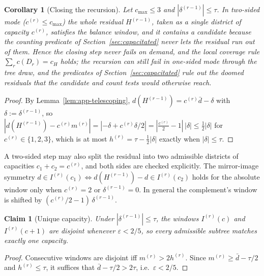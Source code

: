 \documentclass[preprint,12pt,authoryear]{elsarticle}
\newtheorem{corollary}[theorem]{Corollary}
\newtheorem{claim}[theorem]{Claim}
\theoremstyle{definition}
\begin{document}
\begin{corollary}[Closing the recursion]\label{cor:app-closing}\label{thm:feasibility}\label{thm:feas}
Let $c_{\max}\le 3$ and $|\delta^{(r-1)}|\le\tau$. In two-sided mode ($c^{(r)}\le c_{\max}$) the whole residual $H^{(r-1)}$, taken as a single district of capacity $c^{(r)}$, satisfies the balance window, and it contains a candidate because the counting predicate of Section~\ref{sec:capacitated} never lets the residual run out of them. Hence the closing step never fails on demand, and the local coverage rule $\sum_r c(D_r)=c_H$ holds; the recursion can still fail in one-sided mode through the tree draw, and the predicates of Section~\ref{sec:capacitated} rule out the doomed residuals that the candidate and count tests would otherwise reach.
\end{corollary}
\begin{proof}
By Lemma~\ref{lem:app-telescoping}, $d(H^{(r-1)})=c^{(r)}\bar d-\delta$
with $\delta:=\delta^{(r-1)}$, so
$|d(H^{(r-1)})-c^{(r)}m^{(r)}|=|{-\delta}+c^{(r)}\delta/2|
 =|\tfrac{c^{(r)}}{2}-1|\,|\delta|\le\tfrac12|\delta|$ for
$c^{(r)}\in\{1,2,3\}$, which is at most $h^{(r)}=\tau-\tfrac12|\delta|$
exactly when $|\delta|\le\tau$.
\end{proof}

A two-sided step may also split the residual into two admissible districts
of capacities $c_1+c_2=c^{(r)}$, and both sides are checked explicitly. The mirror-image symmetry $d\in I^{(r)}(c_1)\Leftrightarrow d(H^{(r-1)})-d\in I^{(r)}(c_2)$ holds for the absolute window only when $c^{(r)}=2$ or $\delta^{(r-1)}=0$. In general the complement's window is shifted by $(c^{(r)}/2-1)\,\delta^{(r-1)}$.

\begin{claim}[Unique capacity]\label{claim:app-unique}\label{claim:unique-capacity}\label{claim:disjoint}
Under $|\delta^{(r-1)}|\le\tau$, the windows $I^{(r)}(c)$ and
$I^{(r)}(c+1)$ are disjoint whenever $\varepsilon<2/5$, so every admissible subtree matches exactly one capacity.
\end{claim}
\begin{proof}
Consecutive windows are disjoint iff $m^{(r)}>2h^{(r)}$. Since
$m^{(r)}\ge\bar d-\tau/2$ and $h^{(r)}\le\tau$, it suffices that
$\bar d-\tau/2>2\tau$, i.e.\ $\varepsilon<2/5$.
\end{proof}
\end{document}
